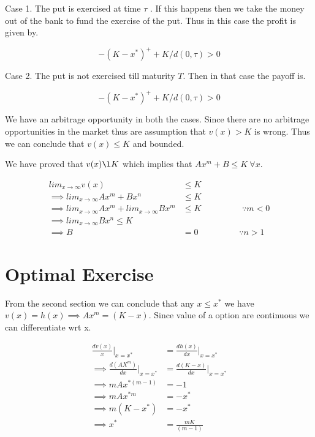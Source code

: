 \documentclass[12pt]{report}
\begin{document}
Case 1. The put is exercised at time $\tau$ . If this happens then we take the money out of the bank to fund the exercise of the put. Thus in this case the profit is given by.

\begin{equation*}
	-(K-x^*)^+  + K/d(0,\tau) > 0
\end{equation*}


Case 2. The put is not exercised till maturity $T$. Then in that case the payoff is.

\begin{equation*}
	-(K-x^*)^+  + K/d(0,\tau) > 0
\end{equation*}

We have an arbitrage opportunity in both the cases. Since there are no arbitrage opportunities in the market thus are assumption that  $v(x) > K$ is wrong. Thus we can conclude that $v(x) \leq K$ and bounded.

We have proved that $v(x) \l K$ which implies that $Ax^m + B \leq K \ \forall x$. 

\begin{equation*}
	\begin{aligned}
		lim_{x\rightarrow \infty} v(x) & \leq K\\
		\implies lim_{x\rightarrow \infty} Ax^m + Bx^n & \leq K\\ 
		\implies lim_{x\rightarrow \infty} Ax^ m + lim_{x\rightarrow \infty} Bx^m & \leq K \hspace{2cm} \text{$\because m < 0$} \\
		\implies lim_{x\rightarrow \infty} Bx^n \leq K \\
		\implies B &= 0 \hspace{2cm} \text{$\because n >1$}
	\end{aligned}
\end{equation*}

\section*{Optimal Exercise}
From the second section we can conclude that any $x \leq x^*$  we have $v(x) = h(x) \implies  Ax^m = (K-x)$. Since value of a option are continuous we can differentiate wrt x. 

\begin{equation*}
	\begin{aligned}
		\frac{dv(x)}{x}|_{x=x^*} &=  \frac{dh(x)}{dx}|_{x=x^*} \\
		\implies \frac{d(AX^m)}{dx}|_{x=x^*} &= \frac{d(K-x)}{dx}|_{x=x^*} \\
		\implies mAx^{*(m-1)} &= -1 \\
		\implies mAx^{*m} &= -x^* \\
		\implies m (K-x^*) &= -x^* \\
		\implies x^* &= \frac{mK}{(m-1)}
	\end{aligned}	
\end{equation*}
\end{document}
